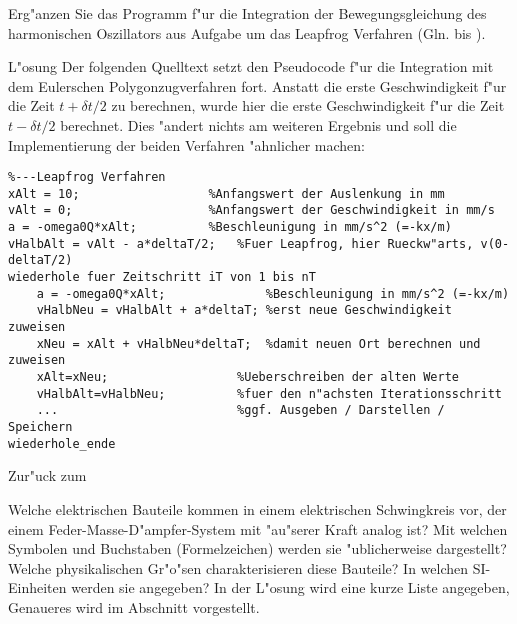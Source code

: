\begin{MExercises}
\begin{MExercise}
Erg"anzen Sie das Programm f"ur die Integration der Bewegungsgleichung des harmonischen Oszillators aus Aufgabe  um das Leapfrog Verfahren (Gln.  bis ). 

\begin{MHint}{L"osung}
  Der folgenden Quelltext setzt den Pseudocode f"ur die Integration mit dem Eulerschen Polygonzugverfahren fort. Anstatt die erste Geschwindigkeit f"ur die Zeit $t+\delta t/2$ zu berechnen, wurde hier die erste Geschwindigkeit f"ur die Zeit $t-\delta t/2$ berechnet. Dies "andert nichts am weiteren Ergebnis und soll die Implementierung der beiden Verfahren "ahnlicher machen:
\begin{verbatim}
%---Leapfrog Verfahren
xAlt = 10;                  %Anfangswert der Auslenkung in mm
vAlt = 0;                   %Anfangswert der Geschwindigkeit in mm/s
a = -omega0Q*xAlt;          %Beschleunigung in mm/s^2 (=-kx/m)
vHalbAlt = vAlt - a*deltaT/2;   %Fuer Leapfrog, hier Rueckw"arts, v(0-deltaT/2)
wiederhole fuer Zeitschritt iT von 1 bis nT
    a = -omega0Q*xAlt;              %Beschleunigung in mm/s^2 (=-kx/m)
    vHalbNeu = vHalbAlt + a*deltaT; %erst neue Geschwindigkeit zuweisen
    xNeu = xAlt + vHalbNeu*deltaT;  %damit neuen Ort berechnen und zuweisen
    xAlt=xNeu;                  %Ueberschreiben der alten Werte
    vHalbAlt=vHalbNeu;          %fuer den n"achsten Iterationsschritt
    ...                         %ggf. Ausgeben / Darstellen / Speichern
wiederhole_ende
\end{verbatim}
\end{MHint}

Zur"uck zum 
\end{MExercise}

\begin{MExercise}
Welche elektrischen Bauteile kommen in einem elektrischen Schwingkreis vor, der einem Feder-Masse-D"ampfer-System mit "au"serer Kraft analog ist? Mit welchen Symbolen und Buchstaben (Formelzeichen) werden sie "ublicherweise dargestellt? Welche physikalischen Gr"o"sen charakterisieren diese Bauteile? In welchen SI-Einheiten werden sie angegeben? In der L"osung wird eine kurze Liste angegeben, Genaueres wird im Abschnitt  vorgestellt.


\end{MExercise}
\end{MExercises}

